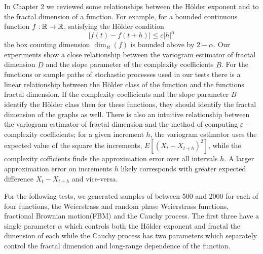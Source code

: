 In Chapter 2 we reviewed some relationships between 
the H\"older exponent and 
to the fractal dimension of a function. For example,
for a bounded continuous function $f:\mathbb R \to \mathbb R$, 
satisfying the H\"older condition 
\[
  |f(t) - f(t+h)| \leq c|h|^{\alpha}
\]
the box counting dimension $\dim_B(f)$ is bounded above
by $2- \alpha$\cite{falconer2003}. 
Our experiments show a close relationship between the variogram 
estimator of fractal dimension $\hat D$ and the slope parameter of the complexity coefficients $B$. 
For the functions or sample paths of stochastic processes
 used in our tests there is a linear relationship 
 between the H\"older class of the function 
 and the functions fractal dimension. If 
 the complexity coefficients and the slope 
 parameter $B$ identify the H\"older class then 
 for these functions, they should identify the 
 fractal dimension of the graphs as well.
 There is also an 
 intuitive relationship between the 
 variogram estimator of fractal dimension and 
 the method of computing $\varepsilon-$complexity 
 coefficients; for a given increment $h$, the 
  variogram estimator uses the expected value 
  of the square the increments, 
   $E[(X_t - X_{t + h})^2]$, while the complexity
   cofficients finds the approximation error 
   over all intervals $h$. A larger approximation 
   error on increments $h$ likely corresponds 
   with greater expected difference $X_t - X_{t +h}$
   and vice-versa. 


For the following tests, we generated samples of between 
500 and 2000 for each of four functions, the Weierstrass
and random phase Weierstrass functions, fractional 
Brownian motion(FBM) and the Cauchy process. The first three have a single parameter $\alpha$ which 
controls both the H\"older exponent and fractal 
the dimension of each while the Cauchy process has two parameters 
which separately control the fractal dimension and 
long-range dependence of the function. 

